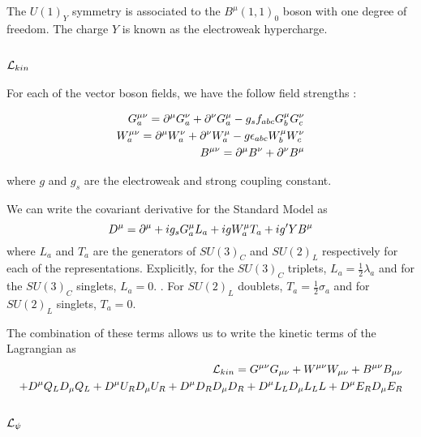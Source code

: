 The $U(1)_Y$ symmetry is associated to the $B^\mu(1,1)_0$ boson with one degree of freedom.
The charge $Y$ is known as the electroweak hypercharge.

\subsection{$\mathcal{L}_{kin}$}

For each of the vector boson fields, we have the follow field strengths :

\begin{equation}
\begin{aligned}
G^{\mu\nu}_a = \partial^\mu G^\nu_a + \partial^\nu G^\mu_a - g_s f_{abc} G^\mu_b G^\nu_c \\
W^{\mu\nu}_a = \partial^\mu W^\nu_a + \partial^\nu W^\mu_a - g \epsilon_{abc} W_b^\mu W_c^\nu \\
B^{\mu\nu}   = \partial^\mu B^\nu   + \partial^\nu B^\mu
\end{aligned}
\end{equation}

where $g$ and $g_s$ are the electroweak and strong coupling constant.

We can write the covariant derivative for the Standard Model as
\begin{equation}
D^\mu = \partial^\mu + ig_s G^\mu_a L_a + i g W^\mu_a T_a + i g' Y B^\mu
\end{equation}
where $L_a$ and $T_a$ are the generators of $SU(3)_C $ and $SU(2)_L$ respectively for each of the representations.
Explicitly, for the $SU(3)_C$ triplets, $L_a = \frac{1}{2} \lambda_a$ and for the $SU(3)_C$ singlets, $L_a = 0$. .
For $SU(2)_L$ doublets, $T_a = \frac{1}{2} \sigma_a $ and for $SU(2)_L$ singlets, $T_a = 0$.

The combination of these terms allows us to write the kinetic terms of the Lagrangian as
\begin{equation}
\begin{aligned}
\mathcal{L}_{kin} = G^{\mu\nu} G_{\mu\nu} + W^{\mu\nu} W_{\mu\nu} + B^{\mu\nu} B_{\mu\nu}\\
 + D^\mu Q_L D_\mu Q_L + D^\mu U_R D_\mu U_R +  D^\mu D_R D_\mu D_R + D^\mu L_L D_\mu L_LL + D^\mu E_R D_\mu E_R
\end{aligned}
\end{equation}

\subsection{$\mathcal{L}_{\psi}$ }

